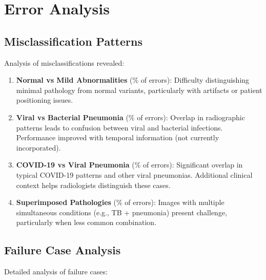 {\section{Error Analysis}

\subsection{Misclassification Patterns}

Analysis of \underline{\hspace{2cm}} misclassifications revealed:

\begin{enumerate}
    \item \textbf{Normal vs Mild Abnormalities} (\underline{\hspace{0.5cm}}\% of errors): Difficulty distinguishing minimal pathology from normal variants, particularly with artifacts or patient positioning issues.
    
    \item \textbf{Viral vs Bacterial Pneumonia} (\underline{\hspace{0.5cm}}\% of errors): Overlap in radiographic patterns leads to confusion between viral and bacterial infections. Performance improved with temporal information (not currently incorporated).
    
    \item \textbf{COVID-19 vs Viral Pneumonia} (\underline{\hspace{0.5cm}}\% of errors): Significant overlap in typical COVID-19 patterns and other viral pneumonias. Additional clinical context helps radiologists distinguish these cases.
    
    \item \textbf{Superimposed Pathologies} (\underline{\hspace{0.5cm}}\% of errors): Images with multiple simultaneous conditions (e.g., TB + pneumonia) present challenge, particularly when less common combination.
\end{enumerate}

\subsection{Failure Case Analysis}

Detailed analysis of \underline{\hspace{2cm}} failure cases:

}
